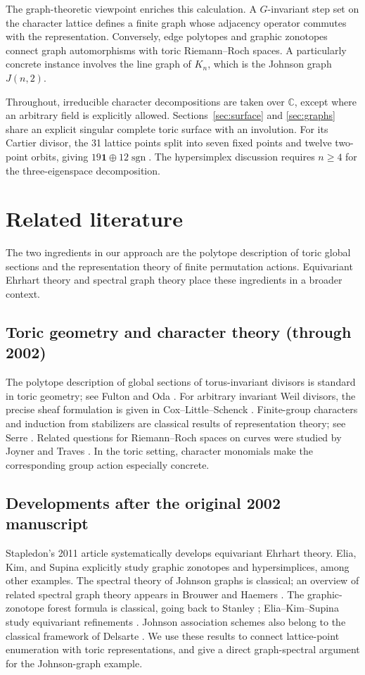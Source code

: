 \documentclass[12pt,letterpaper]{article}
\theoremstyle{definition}
\theoremstyle{remark}
\numberwithin{equation}{section}
\newcommand{\CC}{\mathbb C}
\newcommand{\bfone}{\mathbf 1}
\begin{document}
The graph-theoretic viewpoint enriches this calculation. A $G$-invariant step set on the character lattice defines a finite graph whose adjacency operator commutes with the representation. Conversely, edge polytopes and graphic zonotopes connect graph automorphisms with toric Riemann--Roch spaces. A particularly concrete instance involves the line graph of $K_n$, which is the Johnson graph $J(n,2)$.

Throughout, irreducible character decompositions are taken over $\CC$, except where an arbitrary field is explicitly allowed. Sections~\ref{sec:surface} and \ref{sec:graphs} share an explicit singular complete toric surface with an involution. For its Cartier divisor, the 31 lattice points split into seven fixed points and twelve two-point orbits, giving $19\bfone\oplus12\operatorname{sgn}$. The hypersimplex discussion requires $n\geq4$ for the three-eigenspace decomposition.

\section{Related literature}
The two ingredients in our approach are the polytope description of toric global sections and the representation theory of finite permutation actions. Equivariant Ehrhart theory and spectral graph theory place these ingredients in a broader context.

\subsection*{Toric geometry and character theory (through 2002)}
The polytope description of global sections of torus-invariant divisors is standard in toric geometry; see Fulton \cite{Fu93} and Oda \cite{Od88}. For arbitrary invariant Weil divisors, the precise sheaf formulation is given in Cox--Little--Schenck \cite[Proposition~4.3.3]{CLS11}. Finite-group characters and induction from stabilizers are classical results of representation theory; see Serre \cite{Se77}. Related questions for Riemann--Roch spaces on curves were studied by Joyner and Traves \cite{JT02}. In the toric setting, character monomials make the corresponding group action especially concrete.

\subsection*{Developments after the original 2002 manuscript}
Stapledon's 2011 article \cite{St11} systematically develops equivariant Ehrhart theory. Elia, Kim, and Supina \cite{EKS24} explicitly study graphic zonotopes and hypersimplices, among other examples. The spectral theory of Johnson graphs is classical; an overview of related spectral graph theory appears in Brouwer and Haemers \cite{BH12}. The graphic-zonotope forest formula is classical, going back to Stanley \cite{St91}; Elia--Kim--Supina study equivariant refinements \cite[Section~3.1]{EKS24}. Johnson association schemes also belong to the classical framework of Delsarte \cite{De73}. We use these results to connect lattice-point enumeration with toric representations, and give a direct graph-spectral argument for the Johnson-graph example.
\end{document}
